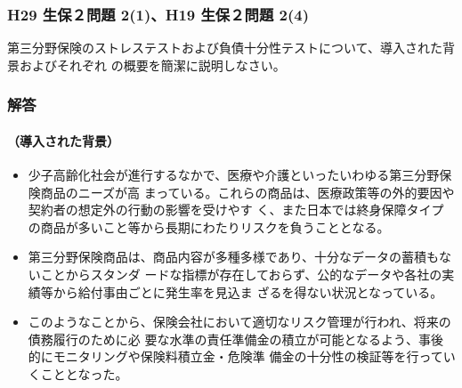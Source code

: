 \documentclass[report,gutter=10mm,fore-edge=10mm,uplatex,dvipdfmx]{jlreq}
\begin{document}
\subsubsection{H29 生保２問題 2(1)、H19 生保２問題 2(4)}
第三分野保険のストレステストおよび負債十分性テストについて、導入された背景およびそれぞれ
の概要を簡潔に説明しなさい。
\subsubsection{解答}
\paragraph{（導入された背景）}
\begin{itemize}
 \item 少子高齢化社会が進行するなかで、医療や介護といったいわゆる第三分野保険商品のニーズが高
まっている。これらの商品は、医療政策等の外的要因や契約者の想定外の行動の影響を受けやす
く、また日本では終身保障タイプの商品が多いこと等から長期にわたりリスクを負うこととなる。
 \item 第三分野保険商品は、商品内容が多種多様であり、十分なデータの蓄積もないことからスタンダ
ードな指標が存在しておらず、公的なデータや各社の実績等から給付事由ごとに発生率を見込ま
ざるを得ない状況となっている。
 \item このようなことから、保険会社において適切なリスク管理が行われ、将来の債務履行のために必
要な水準の責任準備金の積立が可能となるよう、事後的にモニタリングや保険料積立金・危険準
備金の十分性の検証等を行っていくこととなった。
\end{itemize}
\end{document}
